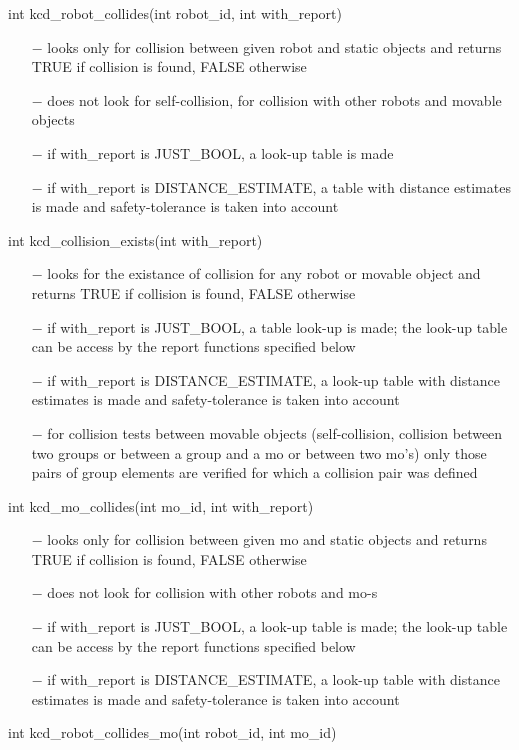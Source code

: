 int kcd\_robot\_collides(int robot\_id, int with\_report)
\begin{itemize}
\item[$-$] looks only for collision between given robot and static objects
  and returns TRUE if collision is found, FALSE otherwise
\item[$-$] does not look for self-collision, for collision with other robots
  and movable objects
\item[$-$] if with\_report is JUST\_BOOL, a look-up table is made
\item[$-$] if with\_report is DISTANCE\_ESTIMATE, a table with distance estimates
  is made and safety-tolerance is taken into account
\end{itemize}
int kcd\_collision\_exists(int with\_report)
\begin{itemize}
\item[$-$] looks for the existance of collision for any robot or movable object
  and returns TRUE if collision is found, FALSE otherwise
\item[$-$] if with\_report is JUST\_BOOL, a table look-up is made; the 
  look-up table can be access by the report functions 
  specified below
\item[$-$] if with\_report is DISTANCE\_ESTIMATE, a look-up table with distance 
  estimates is made and safety-tolerance is taken into account
\item[$-$] for collision tests between movable objects (self-collision,
  collision between two groups or between a group and a mo or
  between two mo's) only those pairs of group elements are 
  verified for which a collision pair was defined
\end{itemize}
int kcd\_mo\_collides(int mo\_id, int with\_report)
\begin{itemize}
\item[$-$] looks only for collision between given mo and static objects
  and returns TRUE if collision is found, FALSE otherwise
\item[$-$] does not look for collision with other robots and mo-s
\item[$-$] if with\_report is JUST\_BOOL, a look-up table is made; the 
  look-up table can be access by the report functions 
  specified below
\item[$-$] if with\_report is DISTANCE\_ESTIMATE, a look-up table with distance 
  estimates is made and safety-tolerance is taken into account
\end{itemize}
int kcd\_robot\_collides\_mo(int robot\_id, int mo\_id)
